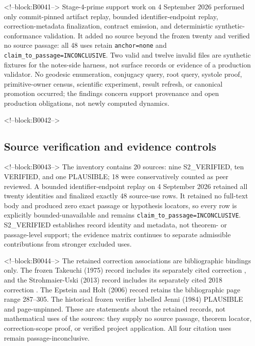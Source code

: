 \documentclass[11pt,a4paper]{article}
\begin{document}
<!--block:B0041-->
Stage-4-prime support work on 4 September 2026 performed only commit-pinned artifact replay, bounded identifier-endpoint replay, correction-metadata finalization, contract emission, and deterministic synthetic-conformance validation. It added no source beyond the frozen twenty and verified no source passage: all 48 uses retain \texttt{anchor=none} and \texttt{claim\_to\_passage=INCONCLUSIVE}. Two valid and twelve invalid files are synthetic fixtures for the notes-side harness, not surface records or evidence of a production validator. No geodesic enumeration, conjugacy query, root query, systole proof, primitive-owner census, scientific experiment, result refresh, or canonical promotion occurred; the findings concern support provenance and open production obligations, not newly computed dynamics.

<!--block:B0042-->
\hypertarget{source-verification-and-evidence-controls}{%
\subsection{Source verification and evidence controls}\label{source-verification-and-evidence-controls}}

<!--block:B0043-->
The inventory contains 20 sources: nine S2\_VERIFIED, ten VERIFIED, and one PLAUSIBLE; 18 were conservatively counted as peer reviewed. A bounded identifier-endpoint replay on 4 September 2026 retained all twenty identities and finalized exactly 48 source-use rows. It retained no full-text body and produced zero exact passage or hypothesis locators, so every row is explicitly bounded-unavailable and remains \texttt{claim\_to\_passage=INCONCLUSIVE}. S2\_VERIFIED establishes record identity and metadata, not theorem- or passage-level support; the evidence matrix continues to separate admissible contributions from stronger excluded uses.

<!--block:B0044-->
The retained correction associations are bibliographic bindings only. The frozen Takeuchi (1975) record includes its separately cited correction
\citep{P33-S03,P33-S03-CORR}
, and the Strohmaier-Uski (2013) record includes its separately cited 2018 correction
\citep{P33-S16,P33-S16-CORR}
. The Epstein and Holt (2006) record
\citep{P33-S12}
 retains the bibliographic page range 287--305. The historical frozen verifier labelled Jenni (1984)
\citep{P33-S06}
 PLAUSIBLE and page-unpinned. These are statements about the retained records, not mathematical uses of the sources: they supply no source passage, theorem locator, correction-scope proof, or verified project application. All four citation uses remain passage-inconclusive.
\end{document}
